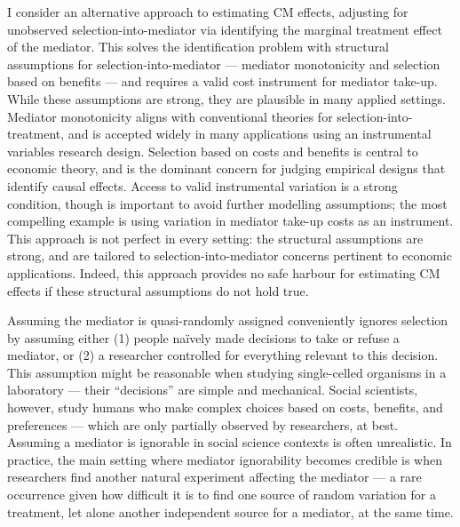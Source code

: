 I consider an alternative approach to estimating CM effects, adjusting for unobserved selection-into-mediator via identifying the marginal treatment effect of the mediator.
This solves the identification problem with structural assumptions for selection-into-mediator --- mediator monotonicity and selection based on benefits --- and requires a valid cost instrument for mediator take-up.
While these assumptions are strong, they are plausible in many applied settings.
Mediator monotonicity aligns with conventional theories for selection-into-treatment, and is accepted widely in many applications using an instrumental variables research design.
Selection based on costs and benefits is central to economic theory, and is the dominant concern for judging empirical designs that identify causal effects.
Access to valid instrumental variation is a strong condition, though is important to avoid further modelling assumptions; the most compelling example is using variation in mediator take-up costs as an instrument.
This approach is not perfect in every setting: the structural assumptions are strong, and are tailored to selection-into-mediator concerns pertinent to economic applications.
Indeed, this approach provides no safe harbour for estimating CM effects if these structural assumptions do not hold true.


Assuming the mediator is quasi-randomly assigned conveniently ignores selection by assuming either (1) people na\"ively made decisions to take or refuse a mediator, or (2) a researcher controlled for everything relevant to this decision.
This assumption might be reasonable when studying single-celled organisms in a laboratory --- their ``decisions'' are simple and mechanical.
Social scientists, however, study humans who make complex choices based on costs, benefits, and preferences --- which are only partially observed by researchers, at best.
Assuming a mediator is ignorable in social science contexts is often unrealistic.
In practice, the main setting where mediator ignorability becomes credible is when researchers find another natural experiment affecting the mediator --- a rare occurrence given how difficult it is to find one source of random variation for a treatment, let alone another independent source for a mediator, at the same time.

